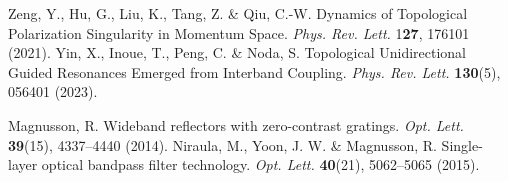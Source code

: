 \documentclass[%
 reprint,
superscriptaddress,
 amsmath,amssymb, aps,
]{revtex4-1}
\begin{document}
\begin{thebibliography}{1}
 Zeng, Y., Hu, G., Liu, K., Tang, Z. \& Qiu, C.-W. Dynamics of Topological Polarization Singularity in Momentum Space. \emph{Phys. Rev. Lett.} {1\bf 27}, 176101 (2021).
 Yin, X., Inoue, T., Peng, C. \& Noda, S. Topological Unidirectional Guided Resonances Emerged from Interband Coupling. \emph{Phys. Rev. Lett.} {\bf 130}(5), 056401 (2023).

 Magnusson, R. Wideband reflectors with zero-contrast gratings. \emph{Opt. Lett.} {\bf 39}(15), 4337--4440 (2014).
 Niraula, M., Yoon, J. W. \& Magnusson, R. Single-layer optical bandpass filter technology. \emph{Opt. Lett.} {\bf 40}(21), 5062--5065 (2015).


\end{thebibliography}
\end{document}
